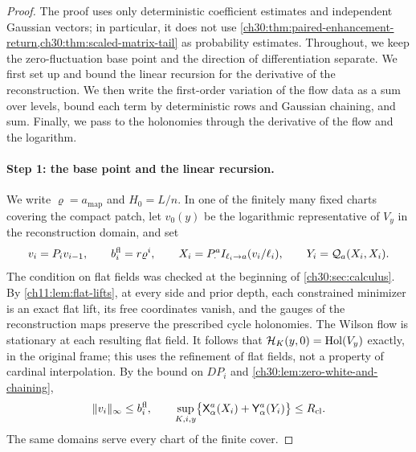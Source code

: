 \begin{proof}
The proof uses only deterministic coefficient estimates and independent Gaussian vectors; in particular, it does not use \cref{ch30:thm:paired-enhancement-return,ch30:thm:scaled-matrix-tail} as probability estimates. Throughout, we keep the zero-fluctuation base point and the direction of differentiation separate. We first set up and bound the linear recursion for the derivative of the reconstruction. We then write the first-order variation of the flow data as a sum over levels, bound each term by deterministic rows and Gaussian chaining, and sum. Finally, we pass to the holonomies through the derivative of the flow and the logarithm.

\paragraph{Step 1: the base point and the linear recursion.} We write $\varrho=a_{\mathrm{map}}$ and $H_0=L/n$. In one of the finitely many fixed charts covering the compact patch, let $v_0(y)$ be the logarithmic representative of $V_y$ in the reconstruction domain, and set
\begin{equation}\label{ch30:eq:flat-linear-base}
 v_i=P_iv_{i-1},\qquad b_i^{\mathrm{fl}}=r\varrho^i,\qquad X_i=P_\cdot^aI_{\ell_i\to a}(v_i/\ell_i),\qquad Y_i=\mathcal Q_{a}(X_i,X_i).
\end{equation}
The condition on flat fields was checked at the beginning of \cref{ch30:sec:calculus}. By \cref{ch11:lem:flat-lifts}, at every side and prior depth, each constrained minimizer is an exact flat lift, its free coordinates vanish, and the gauges of the reconstruction maps preserve the prescribed cycle holonomies. The Wilson flow is stationary at each resulting flat field. It follows that $\mathcal H_K(y,0)=\operatorname{Hol}(V_y)$ exactly, in the original frame; this uses the refinement of flat fields, not a property of cardinal interpolation. By the bound on $DP_i$ and \cref{ch30:lem:zero-white-and-chaining},
\begin{equation}\label{ch30:eq:flat-base-bounds}
 \lVert v_i\rVert_\infty\le b_i^{\mathrm{fl}},\qquad\sup_{K,i,y}\bigl\{\mathsf X_\alpha^a(X_i)+\mathsf Y_\alpha^a(Y_i)\bigr\}\le R_{\mathrm{cl}}.
\end{equation}
The same domains serve every chart of the finite cover.


\end{proof}
